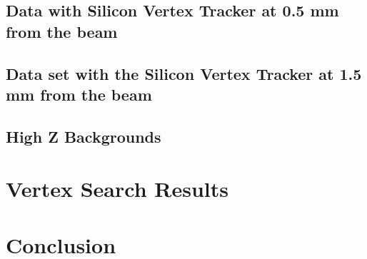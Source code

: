 \documentclass[12pt]{report}
\begin{document}
\section{Data with Silicon Vertex Tracker at 0.5 mm from the beam}
\section{Data set with the Silicon Vertex Tracker at 1.5 mm from the beam}
\section{High Z Backgrounds}

\chapter{Vertex Search Results}
\chapter{Conclusion}
\end{document}
